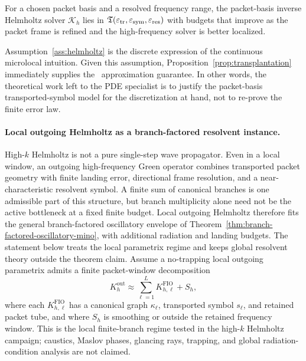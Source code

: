 \begin{assumption}
\label{ass:helmholtz}
For a chosen packet basis and a resolved frequency range, the packet-basis inverse Helmholtz solver $\mathcal K_h$ lies in $\mathfrak T(\varepsilon_{\mathrm{tr}},\varepsilon_{\mathrm{sym}},\varepsilon_{\mathrm{res}})$ with budgets that improve as the packet frame is refined and the high-frequency solver is better localized.
\end{assumption}

Assumption~\ref{ass:helmholtz} is the discrete expression of the continuous microlocal intuition. Given this assumption, Proposition~\ref{prop:transplantation} immediately supplies the \MiNO\ approximation guarantee. In other words, the theoretical work left to the PDE specialist is to justify the packet-basis transported-symbol model for the discretization at hand, not to re-prove the finite error law.

\paragraph{Local outgoing Helmholtz as a branch-factored resolvent instance.}
High-$k$ Helmholtz is not a pure single-step wave propagator.  Even in a local window, an outgoing high-frequency Green operator combines transported packet geometry with finite landing error, directional frame resolution, and a near-characteristic resolvent symbol.  A finite sum of canonical branches is one admissible part of this structure, but branch multiplicity alone need not be the active bottleneck at a fixed finite budget.  Local outgoing Helmholtz therefore fits the general branch-factored oscillatory envelope of Theorem~\ref{thm:branch-factored-oscillatory-mino}, with additional radiation and landing budgets.  The statement below treats the local parametrix regime and keeps global resolvent theory outside the theorem claim.  Assume a no-trapping local outgoing parametrix admits a finite packet-window decomposition
\[
K_h^{\mathrm{out}}
\approx
\sum_{\ell=1}^L K_{h,\ell}^{\mathrm{FIO}}+S_h,
\]
where each $K_{h,\ell}^{\mathrm{FIO}}$ has a canonical graph $\kappa_\ell$, transported symbol $s_\ell$, and retained packet tube, and where $S_h$ is smoothing or outside the retained frequency window.  This is the local finite-branch regime tested in the high-$k$ Helmholtz campaign; caustics, Maslov phases, glancing rays, trapping, and global radiation-condition analysis are not claimed.

